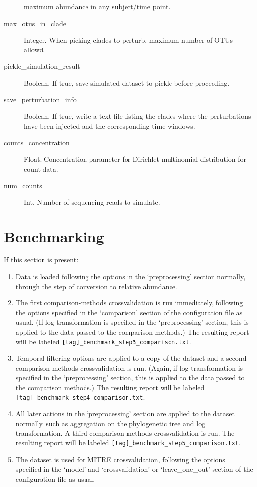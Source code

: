 \documentclass[12pt]{report}
\begin{document}
\begin{description}
  maximum abundance in any subject/time point.
\item[max\_otus\_in\_clade ] Integer. When picking clades to perturb,
  maximum number of OTUs allowd.
\item[pickle\_simulation\_result] Boolean. If true, save simulated
  dataset to pickle before proceeding.
\item[save\_perturbation\_info ] Boolean. If true, write a text file
  listing the clades where the perturbations have been injected and
  the corresponding time windows.
\item[counts\_concentration ] Float. Concentration parameter for
  Dirichlet-multinomial distribution for count data.
\item[num\_counts ] Int. Number of sequencing reads to simulate.

\end{description}

\section{Benchmarking}\label{benchmarking}
If this section is present:
\begin{enumerate}
\item Data is loaded following the options in the `preprocessing' section
    normally, through the step of conversion to relative abundance. 

\item The first comparison-methods crossvalidation is run immediately,
  following the options specified in the `comparison' section of the
  configuration file as usual. (If log-transformation is specified in
  the `preprocessing' section, this is applied to the data passed to the
  comparison methods.) The resulting report will be labeled
  \texttt{[tag]\_benchmark\_step3\_comparison.txt}.

\item Temporal filtering options are applied to a copy of the dataset
  and a second comparison-methods crossvalidation is run. (Again, if
  log-transformation is specified in the `preprocessing' section, this
  is applied to the data passed to the comparison methods.)  The
  resulting report will be labeled
  \texttt{[tag]\_benchmark\_step4\_comparison.txt}.

\item All later actions in the `preprocessing' section are applied to
  the dataset normally, such as aggregation on the phylogenetic tree
  and log transformation. A third comparison-methods crossvalidation
  is run. The resulting report will be labeled
  \texttt{[tag]\_benchmark\_step5\_comparison.txt}.
    
\item The dataset is used for MITRE crossvalidation, following the
  options specified in the `model' and `crossvalidation' or
  `leave\_one\_out' section of the configuration file as usual.
\end{enumerate}
\end{document}
